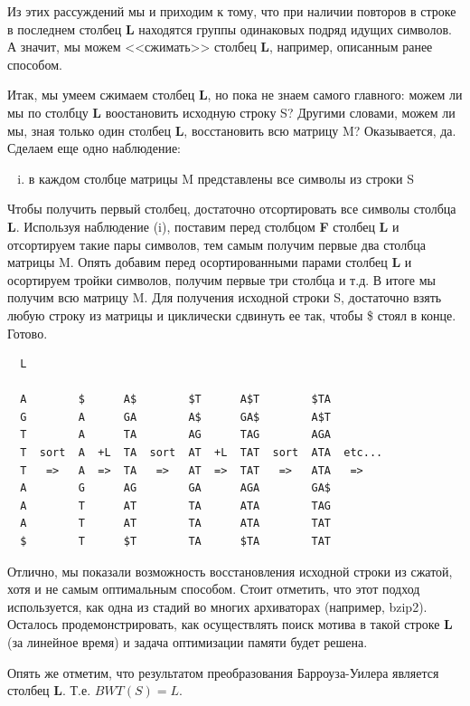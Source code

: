 \documentclass[letterpaper, 11pt]{article}
\begin{document}
Из этих рассуждений мы и приходим к тому, что при наличии повторов в строке в последнем столбец \textbf{L} находятся группы одинаковых подряд идущих символов. А значит, мы можем <<сжимать>> столбец \textbf{L}, например, описанным ранее способом.

Итак, мы умеем сжимаем столбец \textbf{L}, но пока не знаем самого главного: можем ли мы по столбцу \textbf{L} воостановить исходную строку S? Другими словами, можем ли мы, зная только один столбец \textbf{L}, восстановить всю матрицу M? Оказывается, да. Сделаем еще одно наблюдение:
\begin{enumerate}[(iv)]
\item
в каждом столбце матрицы M представлены все символы из строки S
\end{enumerate}

Чтобы получить первый столбец, достаточно отсортировать все символы столбца \textbf{L}. Используя наблюдение (i), поставим перед столбцом \textbf{F} столбец \textbf{L} и отсортируем такие пары символов, тем самым получим первые два столбца матрицы M. Опять добавим перед осортированными парами столбец \textbf{L} и осортируем тройки символов, получим первые три столбца и т.д. В итоге мы получим всю матрицу M. Для получения исходной строки S, достаточно взять любую строку из матрицы и циклически сдвинуть ее так, чтобы \$ стоял в конце. Готово.

\begin{verbatim}
  L         
 
  A        $      A$        $T      A$T        $TA
  G        A      GA        A$      GA$        A$T
  T        A      TA        AG      TAG        AGA
  T  sort  A  +L  TA  sort  AT  +L  TAT  sort  ATA  etc...
  T   =>   A  =>  TA   =>   AT  =>  TAT   =>   ATA   =>
  A        G      AG        GA      AGA        GA$
  A        T      AT        TA      ATA        TAG
  A        T      AT        TA      ATA        TAT
  $        T      $T        TA      $TA        TAT
\end{verbatim}

Отлично, мы показали возможность восстановления исходной строки из сжатой, хотя и не самым оптимальным способом. Стоит отметить, что этот подход используется, как одна из стадий во многих архиваторах (например, bzip2). Осталось продемонстрировать, как осуществлять поиск мотива в такой строке \textbf{L} (за линейное время) и задача оптимизации памяти будет решена.

Опять же отметим, что результатом преобразования Барроуза-Уилера является столбец \textbf{L}. Т.е. $BWT(S) = L$.
\end{document}
